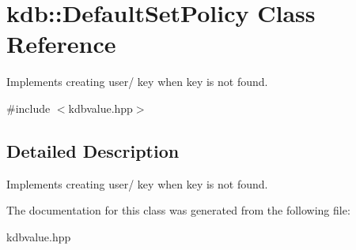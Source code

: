 \hypertarget{classkdb_1_1DefaultSetPolicy}{\section{kdb\-:\-:Default\-Set\-Policy Class Reference}
\label{classkdb_1_1DefaultSetPolicy}
}


Implements creating user/ key when key is not found.  




{\ttfamily \#include $<$kdbvalue.\-hpp$>$}



\subsection{Detailed Description}
Implements creating user/ key when key is not found. 

The documentation for this class was generated from the following file\-:\begin{DoxyCompactItemize}
\item 
kdbvalue.\-hpp\end{DoxyCompactItemize}
